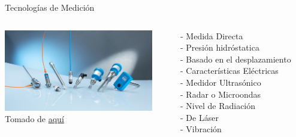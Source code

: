 \documentclass[aspectratio=169]{beamer}
\begin{document}
\begin{frame}{Tecnologías de Medición}

 \begin{columns}[c, onlytextwidth]
        \begin{column}{0.40\textwidth}
        \centering
            \includegraphics[width=6.5cm]{fig/Nivel/level-sensors.jpg}
            \\ \tiny{Tomado de \href{https://sickusablog.com/level-measurement-choosing-right-sensor/}{aquí}}
        \end{column}
        \begin{column}{0.50\textwidth}
               \centering
        {- Medida Directa \\
        - Presión hidróstatica \\
        - Basado en el desplazamiento\\
        - Características Eléctricas\\
        - Medidor Ultrasónico\\
        - Radar o Microondas\\
        - Nivel de Radiación\\
        - De Láser\\
        - Vibración\\
        }
        \end{column}
    \end{columns}


\end{frame}
\end{document}
